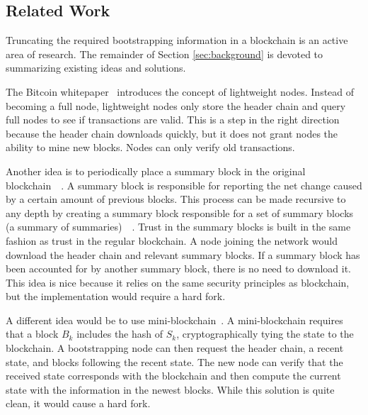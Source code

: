 

\subsection{Related Work}

Truncating the required bootstrapping information in a blockchain is an active area of research.
The remainder of Section \ref{sec:background} is devoted to summarizing existing ideas and solutions.


The Bitcoin whitepaper~\cite{nakamoto2009Bitcoin} introduces the concept of lightweight nodes.
Instead of becoming a full node, lightweight nodes only store the header chain and query full nodes to see if transactions are valid.
This is a step in the right direction because the header chain downloads quickly, but it does not grant nodes the ability to mine new blocks.
Nodes can only verify old transactions.


Another idea is to periodically place a summary block in the original blockchain~\cite{palai2018BlockSummariesSameChain}~\cite{nadiya2018BlockSummaries(ExtendsPalai)}.
A summary block is responsible for reporting the net change caused by a certain amount of previous blocks.
This process can be made recursive to any depth by creating a summary block responsible for a set of summary blocks (a summary of summaries)~\cite{palai2018BlockSummariesSameChain}~\cite{nadiya2018BlockSummaries(ExtendsPalai)}.
Trust in the summary blocks is built in the same fashion as trust in the regular blockchain.
A node joining the network would download the header chain and relevant summary blocks.
If a summary block has been accounted for by another summary block, there is no need to download it.
This idea is nice because it relies on the same security principles as blockchain, but the implementation would require a hard fork.


A different idea would be to use mini-blockchain~\cite{bruce2014Miniblockchain}.
A mini-blockchain requires that a block $B_k$ includes the hash of $S_k$, cryptographically tying the state to the blockchain.
A bootstrapping node can then request the header chain, a recent state, and blocks following the recent state.
The new node can verify that the received state corresponds with the blockchain and then compute the current state with the information in the newest blocks.
While this solution is quite clean, it would cause a hard fork.

